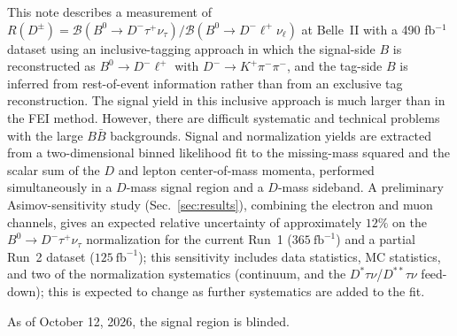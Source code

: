 This note describes a measurement of
$R(D^{\pm}) = \mathcal{B}(B^{0} \to D^{-} \tau^{+} \nu_{\tau}) /
              \mathcal{B}(B^{0} \to D^{-} \ell^{+} \nu_{\ell})$
at Belle~II with a 490 fb$^{-1}$ dataset using an inclusive-tagging approach in which the signal-side
$B$ is reconstructed as $B^{0} \to D^{-} \ell^{+}$ with
$D^{-} \to K^{+} \pi^{-} \pi^{-}$, and the tag-side $B$ is inferred from
rest-of-event information rather than from an exclusive tag reconstruction.
The signal yield in this inclusive approach is much larger than in the FEI method. However, there are difficult systematic and technical problems with the large $B\bar{B}$ backgrounds.
Signal and normalization yields are extracted from a two-dimensional binned
likelihood fit to the missing-mass squared and the scalar sum of the
$D$ and lepton center-of-mass momenta, performed simultaneously in a
$D$-mass signal region and a $D$-mass sideband. A preliminary Asimov-sensitivity study (Sec.~\ref{sec:results}), combining
the electron and muon channels, gives an expected relative uncertainty
of approximately $12\%$ on the $B^{0}\to D^{-}\tau^{+}\nu_{\tau}$
normalization for the current Run~1 ($365~\mathrm{fb}^{-1}$) and a partial Run~2 dataset ($125~\mathrm{fb}^{-1}$); this
sensitivity includes data statistics, MC statistics, and two of the normalization
systematics (continuum, and the $D^{*}\tau\nu$/$D^{**}\tau\nu$
feed-down); this is expected to change as further systematics are added to
the fit.

As of October 12, 2026, the signal region is blinded.
